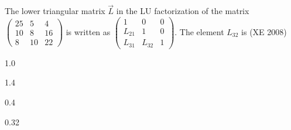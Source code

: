\item The lower triangular matrix $\vec{L}$ in the LU factorization of the matrix
$\begin{pmatrix}
    25&5&4\\10&8&16\\8&10&22
\end{pmatrix}$ is written as $\begin{pmatrix}
    1&0&0\\L_{21}&1&0\\L_{31}&L_{32}&1
\end{pmatrix}$. The element $L_{32}$ is 
\hfill (XE 2008)
\begin{enumerate}
\begin{multicols}{4}
\item 1.0 
\item 1.4 
\item 0.4 
\item 0.32
\end{multicols}
\end{enumerate}

